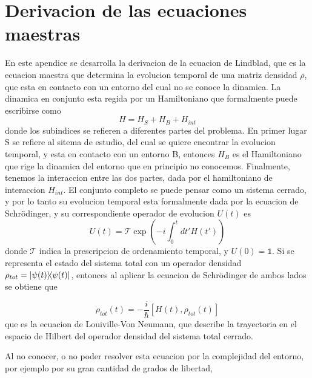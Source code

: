 \chapter{Derivacion de las ecuaciones maestras}
\label{ap_ecsmaestras}

\pagestyle{fancy}
\fancyhf{}
\fancyhead[LE]{\nouppercase{\rightmark\hfill}}
\fancyhead[RO]{\nouppercase{\leftmark\hfill}}
\fancyfoot[LE,RO]{\hfill\thepage\hfill}

En este apendice se desarrolla la derivacion de la ecuacion de Lindblad, que es la ecuacion maestra que determina la evolucion temporal de una matriz densidad $\rho$, que esta en contacto con un entorno del cual no se conoce la dinamica. La dinamica en conjunto esta regida por un Hamiltoniano que formalmente puede escribirse como
\begin{equation}
    H=H_S+H_B+H_{int}
\end{equation}
donde los subindices se refieren a diferentes partes del problema. En primer lugar S se refiere al sitema de estudio, del cual se quiere encontrar la evolucion temporal, y esta en contacto con un entorno B, entonces $H_B$ es el Hamiltoniano que rige la dinamica del entorno que en principio no conocemos. Finalmente, tenemos la interaccion entre las dos partes, dada por el hamiltoniano de interaccion $H_{int}$.
El conjunto completo se puede pensar como un sistema cerrado, y por lo tanto su evolucion temporal esta formalmente dada por la ecuacion de Schr\"odinger, y su correspondiente operador de evolucion $U(t)$ es
\begin{equation}
    U(t)=\mathcal{T}\exp\left( -i\int_{0}^{t}dt'H(t') \right)
\end{equation}
donde $\mathcal{T}$ indica la prescripcion de ordenamiento temporal, y $U(0)=\mathbb{1}$. Si se representa el estado del sistema total con un operador densidad $\rho_{tot}=\ketbra{\psi(t)}{\psi(t)}$, entonces al aplicar la ecuacion de Schr\"odinger de ambos lados se obtiene que 

\begin{equation}
    \dot\rho_{tot}(t)=-\frac{i}{\hbar}[H(t),\rho_{tot}(t)]
\end{equation}
que es la ecuacion de Louiville-Von Neumann, que describe la trayectoria en el espacio de Hilbert del operador densidad del sistema total cerrado.


Al no conocer, o no poder resolver esta ecuacion por la complejidad del entorno, por ejemplo por su gran cantidad de grados de libertad, 
